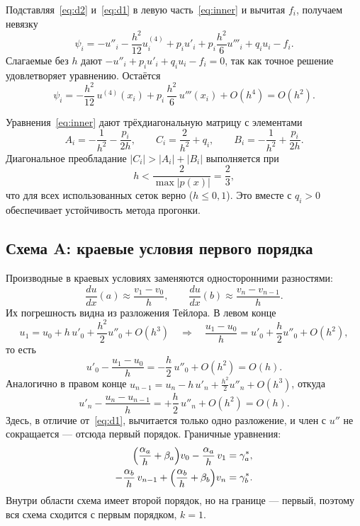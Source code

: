 \documentclass[12pt,a4paper]{article}
\begin{document}
Подставляя~\eqref{eq:d2} и~\eqref{eq:d1} в левую часть~\eqref{eq:inner} и
вычитая $f_i$, получаем невязку
\[
\psi_i=-u''_i-\frac{h^2}{12}u^{(4)}_i
       +p_iu'_i+p_i\frac{h^2}{6}u'''_i+q_iu_i-f_i .
\]
Слагаемые без $h$ дают $-u''_i+p_iu'_i+q_iu_i-f_i=0$, так как точное
решение удовлетворяет уравнению. Остаётся
\begin{equation}\label{eq:psi}
\psi_i = -\frac{h^2}{12}\,u^{(4)}(x_i)+p_i\,\frac{h^2}{6}\,u'''(x_i)+O(h^4)
       = O(h^2).
\end{equation}

Уравнения~\eqref{eq:inner} дают трёхдиагональную матрицу с элементами
\[
A_i=-\frac1{h^2}-\frac{p_i}{2h},\qquad
C_i=\frac2{h^2}+q_i,\qquad
B_i=-\frac1{h^2}+\frac{p_i}{2h}.
\]
Диагональное преобладание $|C_i|>|A_i|+|B_i|$ выполняется при
\begin{equation}\label{eq:dd}
h<\frac{2}{\max|p(x)|}=\frac{2}{3},
\end{equation}
что для всех использованных сеток верно ($h\le 0{,}1$). Это вместе с
$q_i>0$ обеспечивает устойчивость метода прогонки.

\subsection{Схема A: краевые условия первого порядка}
\label{sec:scheme1}

Производные в краевых условиях заменяются односторонними разностями:
\[
\frac{du}{dx}(a)\approx\frac{v_1-v_0}{h},\qquad
\frac{du}{dx}(b)\approx\frac{v_n-v_{n-1}}{h}.
\]
Их погрешность видна из разложения Тейлора. В левом конце
\[
u_1=u_0+h\,u'_0+\frac{h^2}{2}u''_0+O(h^3)
\quad\Longrightarrow\quad
\frac{u_1-u_0}{h}=u'_0+\frac{h}{2}u''_0+O(h^2),
\]
то есть
\begin{equation}\label{eq:onesided}
u'_0-\frac{u_1-u_0}{h}=-\frac{h}{2}\,u''_0+O(h^2)=O(h).
\end{equation}
Аналогично в правом конце $u_{n-1}=u_n-h\,u'_n+\tfrac{h^2}{2}u''_n+O(h^3)$,
откуда
\[
u'_n-\frac{u_n-u_{n-1}}{h}=+\frac{h}{2}\,u''_n+O(h^2)=O(h).
\]
Здесь, в отличие от~\eqref{eq:d1}, вычитается только одно разложение,
и член с $u''$ не сокращается --- отсюда первый порядок. Граничные
уравнения:
\begin{equation}\label{eq:bc1}
\begin{aligned}
\Bigl(\frac{\alpha_a}{h}+\beta_a\Bigr)v_0-\frac{\alpha_a}{h}\,v_1
   &= \gamma^*_a,\\
-\frac{\alpha_b}{h}\,v_{n-1}+\Bigl(\frac{\alpha_b}{h}+\beta_b\Bigr)v_n
   &= \gamma^*_b .
\end{aligned}
\end{equation}
Внутри области схема имеет второй порядок, но на границе --- первый,
поэтому вся схема сходится с первым порядком, $k=1$.
\end{document}
